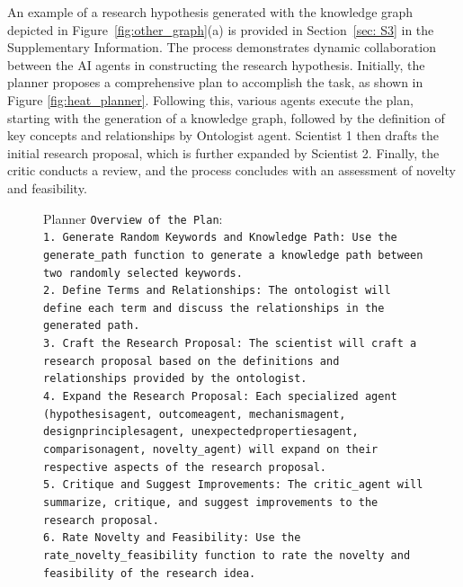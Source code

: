\documentclass{article}
\begin{document}
An example of a research hypothesis generated with the knowledge graph depicted in Figure~\ref{fig:other_graph}(a) is provided in Section~\ref{sec: S3} in the Supplementary Information. The process demonstrates dynamic collaboration between the AI agents in constructing the research hypothesis. Initially, the planner proposes a comprehensive plan to accomplish the task, as shown in Figure \ref{fig:heat_planner}. Following this, various agents execute the plan, starting with the generation of a knowledge graph, followed by the definition of key concepts and relationships by Ontologist agent. Scientist 1 then drafts the initial research proposal, which is further expanded by Scientist 2. Finally, the critic conducts a review, and the process concludes with an assessment of novelty and feasibility.

\begin{figure}[h]
    \centering
\begin{Box1}[colbacktitle={white!90!white}, colback={black!3!white}]{Planner}
\footnotesize{\texttt{Overview of the Plan}}:
\\
\footnotesize{\texttt{1. Generate Random Keywords and Knowledge Path: Use the generate\_path function to generate a knowledge path between two randomly selected keywords.}}
\\
\footnotesize{\texttt{2. Define Terms and Relationships: The ontologist will define each term and discuss the relationships in the generated path.}}
\\
\footnotesize{\texttt{3. Craft the Research Proposal: The scientist will craft a research proposal based on the definitions and relationships provided by the ontologist.}}
\\
\footnotesize{\texttt{4. Expand the Research Proposal: Each specialized agent (hypothesisagent, outcomeagent, mechanismagent, designprinciplesagent, unexpectedpropertiesagent, comparisonagent,
novelty\_agent) will expand on their respective aspects of the research proposal.}}
\\
\footnotesize{\texttt{5. Critique and Suggest Improvements: The critic\_agent will summarize, critique, and suggest improvements to the research proposal.}}
\\
\footnotesize{\texttt{6. Rate Novelty and Feasibility: Use the rate\_novelty\_feasibility function to rate the novelty and feasibility of the research idea.}}
\end{Box1}

\end{figure}
\end{document}
